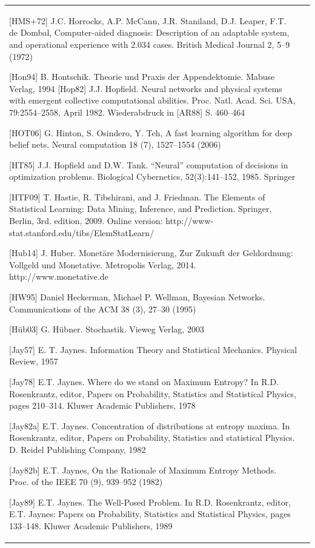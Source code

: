 \documentclass[10pt]{book}
\begin{document}
\begin{tabular}{|l|l|}
[HMS+72] J.C. Horrocks, A.P. McCann, J.R. Staniland, D.J. Leaper, F.T. de Dombal, Computer-aided diagnosis: Description of an adaptable system, and operational experience with 2.034 cases. British Medical Journal 2, 5--9 (1972)

[Hon94] B. Hontschik. Theorie und Praxis der Appendektomie. Mabuse Verlag, 1994
[Hop82] J.J. Hopfield. Neural networks and physical systems with emergent collective computational abilities. Proc. Natl. Acad. Sci. USA, 79:2554–2558, April 1982. Wiederabdruck in [AR88] S. 460–464

[HOT06] G. Hinton, S. Osindero, Y. Teh, A fast learning algorithm for deep belief nets. Neural computation 18 (7), 1527–1554 (2006)

[HT85] J.J. Hopfield and D.W. Tank. “Neural” computation of decisions in optimization problems. Biological Cybernetics, 52(3):141–152, 1985. Springer

[HTF09] T. Hastie, R. Tibshirani, and J. Friedman. The Elements of Statistical Learning: Data Mining, Inference, and Prediction. Springer, Berlin, 3rd. edition, 2009. Online version: http://www-stat.stanford.edu/tibs/ElemStatLearn/

[Hub14] J. Huber. Monetäre Modernisierung, Zur Zukunft der Geldordnung: Vollgeld und Monetative. Metropolis Verlag, 2014. http://www.monetative.de

[HW95] Daniel Heckerman, Michael P. Wellman, Bayesian Networks. Communications of the ACM 38 (3), 27–30 (1995)

[Hüb03] G. Hübner. Stochastik. Vieweg Verlag, 2003

[Jay57] E. T. Jaynes. Information Theory and Statistical Mechanics. Physical Review, 1957

[Jay78] E.T. Jaynes. Where do we stand on Maximum Entropy? In R.D. Rosenkrantz, editor, Papers on Probability, Statistics and Statistical Physics, pages 210–314. Kluwer Academic Publishers, 1978

[Jay82a] E.T. Jaynes. Concentration of distributions at entropy maxima. In Rosenkrantz, editor, Papers on Probability, Statistics and statistical Physics. D. Reidel Publishing Company, 1982

[Jay82b] E.T. Jaynes, On the Rationale of Maximum Entropy Methods. Proc. of the IEEE 70 (9), 939–952 (1982)

[Jay89] E.T. Jaynes. The Well-Posed Problem. In R.D. Rosenkrantz, editor, E.T. Jaynes: Papers on Probability, Statistics and Statistical Physics, pages 133–148. Kluwer Academic Publishers, 1989


\end{tabular}
\end{document}
